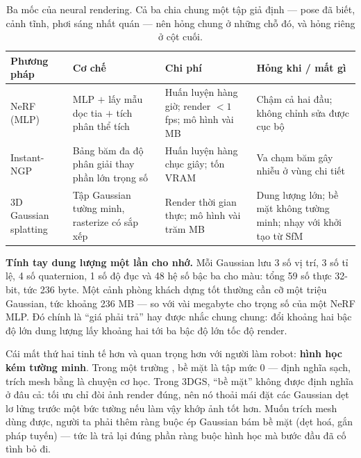 \documentclass[../../../deep_learning.tex]{subfiles}
\begin{document}
\begin{table}[H]\centering\small
\caption{Ba mốc của neural rendering. Cả ba chia chung một tập giả định --- pose đã biết, cảnh tĩnh, phơi sáng nhất quán --- nên hỏng chung ở những chỗ đó, và hỏng riêng ở cột cuối.}
\label{tab:nerf-3dgs}
\begin{tabularx}{\linewidth}{@{}L{2.1cm}YL{2.3cm}Y@{}}
\toprule
\textbf{Phương pháp} & \textbf{Cơ chế} & \textbf{Chi phí} & \textbf{Hỏng khi / mất gì}\\
\midrule
NeRF (MLP) & MLP \(+\) lấy mẫu dọc tia \(+\) tích phân thể tích & Huấn luyện hàng giờ; render \(<1\) fps; mô hình vài MB & Chậm cả hai đầu; không chỉnh sửa được cục bộ\\
Instant-NGP & Bảng băm đa độ phân giải thay phần lớn trọng số & Huấn luyện hàng chục giây; tốn VRAM & Va chạm băm gây nhiễu ở vùng chi tiết\\
3D Gaussian splatting & Tập Gaussian tường minh, rasterize có sắp xếp & Render thời gian thực; mô hình vài trăm MB & Dung lượng lớn; bề mặt không tường minh; nhạy với khởi tạo từ SfM\\
\bottomrule
\end{tabularx}
\end{table}

\textbf{Tính tay dung lượng một lần cho nhớ.} Mỗi Gaussian lưu 3 số vị trí, 3 số tỉ lệ, 4 số quaternion, 1 số độ đục và 48 hệ số  bậc ba cho màu: tổng 59 số thực 32-bit, tức 236 byte. Một cảnh phòng khách dựng tốt thường cần cỡ một triệu Gaussian, tức khoảng 236 MB --- so với vài megabyte cho trọng số của một NeRF MLP. Đó chính là ``giá phải trả'' hay được nhắc chung chung: đổi khoảng hai bậc độ lớn dung lượng lấy khoảng hai tới ba bậc độ lớn tốc độ render.

Cái mất thứ hai tinh tế hơn và quan trọng hơn với người làm robot: \textbf{hình học kém tường minh}. Trong một trường , bề mặt là tập mức 0 --- định nghĩa sạch, trích mesh bằng  là chuyện cơ học. Trong 3DGS, ``bề mặt'' không được định nghĩa ở đâu cả: tối ưu chỉ đòi ảnh render đúng, nên nó thoải mái đặt các Gaussian dẹt lơ lửng trước một bức tường nếu làm vậy khớp ảnh tốt hơn. Muốn trích mesh dùng được, người ta phải thêm ràng buộc ép Gaussian bám bề mặt (dẹt hoá, gắn pháp tuyến) --- tức là trả lại đúng phần ràng buộc hình học mà bước đầu đã cố tình bỏ đi.
\end{document}
